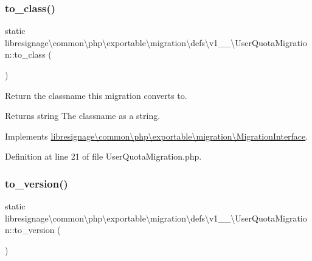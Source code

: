 \subsubsection{\texorpdfstring{to\+\_\+class()}{to\_class()}}
{\footnotesize\ttfamily static libresignage\textbackslash{}common\textbackslash{}php\textbackslash{}exportable\textbackslash{}migration\textbackslash{}defs\textbackslash{}v1\+\_\+\_\textbackslash{}\+User\+Quota\+Migration\+::to\+\_\+class (\begin{DoxyParamCaption}{ }\end{DoxyParamCaption})\hspace{0.3cm}{\ttfamily [static]}}

Return the classname this migration converts to.

\begin{DoxyReturn}{Returns}
string The classname as a string. 
\end{DoxyReturn}


Implements \hyperlink{interfacelibresignage_1_1common_1_1php_1_1exportable_1_1migration_1_1MigrationInterface_ab1f33cdd8684595d6b000bcbc7c4d5a4}{libresignage\textbackslash{}common\textbackslash{}php\textbackslash{}exportable\textbackslash{}migration\textbackslash{}\+Migration\+Interface}.



Definition at line 21 of file User\+Quota\+Migration.\+php.

\mbox{\label{classlibresignage_1_1common_1_1php_1_1exportable_1_1migration_1_1defs_1_1v1__0__0_1_1UserQuotaMigration_a66e81971271ea69fbb979d832f0298ac}} 
\subsubsection{\texorpdfstring{to\+\_\+version()}{to\_version()}}
{\footnotesize\ttfamily static libresignage\textbackslash{}common\textbackslash{}php\textbackslash{}exportable\textbackslash{}migration\textbackslash{}defs\textbackslash{}v1\+\_\+\_\textbackslash{}\+User\+Quota\+Migration\+::to\+\_\+version (\begin{DoxyParamCaption}{ }\end{DoxyParamCaption})\hspace{0.3cm}{\ttfamily [static]}}

